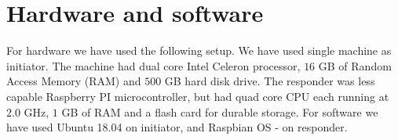 \section{Hardware and software}
\label{sec:hardware}

For hardware we have used the following setup. We have used single 
machine as initiator. The machine had dual core Intel Celeron 
processor, $16$ GB of Random Access Memory (RAM) and $500$ GB
hard disk drive. The responder was less capable Raspberry PI 
microcontroller, but had quad core CPU each running at $2.0$ GHz, 
$1$ GB of RAM and a flash card for durable storage. For software 
we have used Ubuntu 18.04 on initiator, and Raspbian OS - on responder.